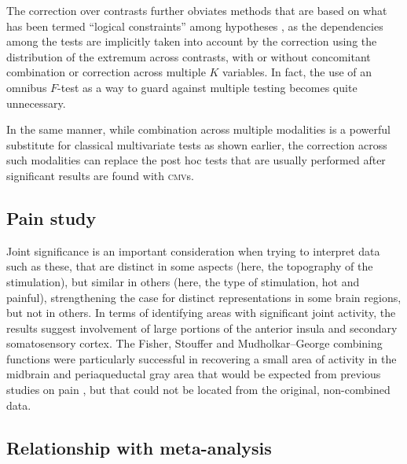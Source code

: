 The correction over contrasts further obviates methods that are based on what has been termed ``logical constraints'' among hypotheses \citep{Shaffer1986, Hochberg1987}, as the dependencies among the tests are implicitly taken into account by the correction using the distribution of the extremum across contrasts, with or without concomitant combination or correction across multiple $K$ variables. In fact, the use of an omnibus $F$-test as a way to guard against multiple testing becomes quite unnecessary.

In the same manner, while combination across multiple modalities is a powerful substitute for classical multivariate tests as shown earlier, the correction across such modalities can replace the post hoc tests that are usually performed after significant results are found with \textsc{cmv}s.

\subsection{Pain study}

Joint significance is an important consideration when trying to interpret data such as these, that are distinct in some aspects (here, the topography of the stimulation), but similar in others (here, the type of stimulation, hot and painful), strengthening the case for distinct representations in some brain regions, but not in others. In terms of identifying areas with significant joint activity, the results suggest involvement of large portions of the anterior insula and secondary somatosensory cortex. The Fisher, Stouffer and Mudholkar--George combining functions were particularly successful in recovering a small area of activity in the midbrain and periaqueductal gray area that would be expected from previous studies on pain \citep{Reynolds1969, Petrovic2002, Tracey2002, Roy2014}, but that could not be located from the original, non-combined data.

\subsection{Relationship with meta-analysis}

